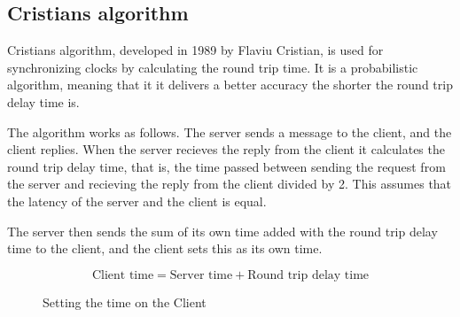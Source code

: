 \subsection{Cristians algorithm}
Cristians algorithm\cite{cristian}, developed in 1989 by Flaviu Cristian, is used for synchronizing clocks by calculating the round trip time. It is a probabilistic algorithm\cite{cristian}, meaning that it it delivers a better accuracy the shorter the round trip delay time is. 

The algorithm works as follows. The server sends a message to the client, and the client replies. When the server recieves the reply from the client it calculates the round trip delay time, that is, the time passed between sending the request from the server and recieving the reply from the client divided by 2. This assumes that the latency of the server and the client is equal.

The server then sends the sum of its own time added with the round trip delay time to the client, and the client sets this as its own time. 

\begin{figure}[h!]
	\begin{displaymath}
		\text{Client time} = \text{Server time} + \text{Round trip delay time}
	\end{displaymath}
	\caption{Setting the time on the Client}
	\label{fig:crist}
\end{figure}

